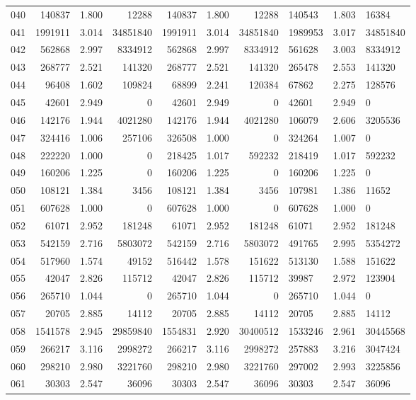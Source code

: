 \begin{longtable}{crrrrrr}
040 & 140837 & 1.800 & 12288 & 140837 & 1.800 & 12288 & 140543 & 1.803 & 16384 \\
041 & 1991911 & 3.014 & 34851840 & 1991911 & 3.014 & 34851840 & 1989953 & 3.017 & 34851840 \\
042 & 562868 & 2.997 & 8334912 & 562868 & 2.997 & 8334912 & 561628 & 3.003 & 8334912 \\
043 & 268777 & 2.521 & 141320 & 268777 & 2.521 & 141320 & 265478 & 2.553 & 141320 \\
044 & 96408 & 1.602 & 109824 & 68899 & 2.241 & 120384 & 67862 & 2.275 & 128576 \\
045 & 42601 & 2.949 & 0 & 42601 & 2.949 & 0 & 42601 & 2.949 & 0 \\
046 & 142176 & 1.944 & 4021280 & 142176 & 1.944 & 4021280 & 106079 & 2.606 & 3205536 \\
047 & 324416 & 1.006 & 257106 & 326508 & 1.000 & 0 & 324264 & 1.007 & 0 \\
048 & 222220 & 1.000 & 0 & 218425 & 1.017 & 592232 & 218419 & 1.017 & 592232 \\
049 & 160206 & 1.225 & 0 & 160206 & 1.225 & 0 & 160206 & 1.225 & 0 \\
050 & 108121 & 1.384 & 3456 & 108121 & 1.384 & 3456 & 107981 & 1.386 & 11652 \\
051 & 607628 & 1.000 & 0 & 607628 & 1.000 & 0 & 607628 & 1.000 & 0 \\
052 & 61071 & 2.952 & 181248 & 61071 & 2.952 & 181248 & 61071 & 2.952 & 181248 \\
053 & 542159 & 2.716 & 5803072 & 542159 & 2.716 & 5803072 & 491765 & 2.995 & 5354272 \\
054 & 517960 & 1.574 & 49152 & 516442 & 1.578 & 151622 & 513130 & 1.588 & 151622 \\
055 & 42047 & 2.826 & 115712 & 42047 & 2.826 & 115712 & 39987 & 2.972 & 123904 \\
056 & 265710 & 1.044 & 0 & 265710 & 1.044 & 0 & 265710 & 1.044 & 0 \\
057 & 20705 & 2.885 & 14112 & 20705 & 2.885 & 14112 & 20705 & 2.885 & 14112 \\
058 & 1541578 & 2.945 & 29859840 & 1554831 & 2.920 & 30400512 & 1533246 & 2.961 & 30445568 \\
059 & 266217 & 3.116 & 2998272 & 266217 & 3.116 & 2998272 & 257883 & 3.216 & 3047424 \\
060 & 298210 & 2.980 & 3221760 & 298210 & 2.980 & 3221760 & 297002 & 2.993 & 3225856 \\
061 & 30303 & 2.547 & 36096 & 30303 & 2.547 & 36096 & 30303 & 2.547 & 36096 \\

\end{longtable}

